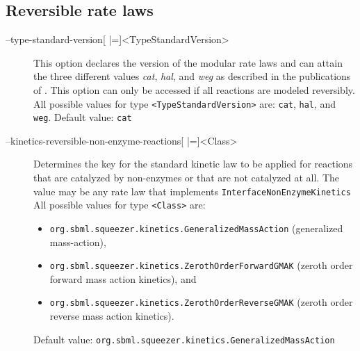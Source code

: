 \subsection{Reversible rate laws}
\begin{description}
\item[--type-standard-version{[} |={]}<TypeStandardVersion>]
  This option declares the version of the modular rate laws and
  can attain the three different values \emph{cat}, \emph{hal}, and \emph{weg}
  as described in the publications of \citet{Liebermeister2010}. This option
  can only be accessed if all reactions are modeled reversibly.
  All possible values for type \texttt{<TypeStandardVersion>} are:
  \texttt{cat}, \texttt{hal}, and \texttt{weg}.
  Default value: \texttt{cat}

\item[--kinetics-reversible-non-enzyme-reactions{[} |={]}<Class>]
  Determines the key for the standard kinetic law to be applied
  for reactions that are catalyzed by non-enzymes or that are
  not catalyzed at all. The value may be any rate law that implements
  \texttt{InterfaceNonEnzymeKinetics}
  All possible values for type \texttt{<Class>} are:
  \begin{itemize}
  \item\texttt{org.sbml.squeezer.kinetics.GeneralizedMassAction} (generalized mass-action),
  \item\texttt{org.sbml.squeezer.kinetics.ZerothOrderForwardGMAK} (zeroth order forward mass action kinetics), and
  \item\texttt{org.sbml.squeezer.kinetics.ZerothOrderReverseGMAK} (zeroth order reverse mass action kinetics).
  \end{itemize}
  Default value: \texttt{org.sbml.squeezer.kinetics.GeneralizedMassAction}


\end{description}
